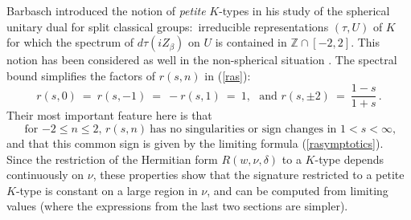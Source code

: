 \documentclass[12pt]{article}
\numberwithin{equation}{section}
\newcommand{\Z}{{\mathbb{Z}}}
\renewcommand\({\left(}
\renewcommand\){\right)}
\begin{document}
Barbasch \cite{petite} introduced the notion of {\it petite} $K$-types in his study of the spherical unitary dual for split classical groups:~irreducible representations $(\tau,U)$  of $K$ for which the spectrum of $d\tau(iZ_\beta)$ on $U$ is contained in $\Z\cap[-2,2]$.  This notion has been considered as well in the non-spherical situation \cite{jeringu,annegret}.
  The spectral bound simplifies the factors of $r(s,n)$ in (\ref{ras}):
\begin{equation}\label{smallras}
 r(s,0) \ = \ r(s,-1) \ = \ -r(s,1) \ = \ 1,  \text{~~and~}r(s,\pm 2) \ = \ \frac{1-s}{1+s}\,.
\end{equation}
 Their most important feature here is that
\begin{equation}\label{rasdoesntchangesign}
  \text{ for $-2\le n \le 2$,~} r(s,n) \ \text{has no singularities or sign changes in }1<s<\infty,
\end{equation}
and that this common sign is given by the limiting formula (\ref{rasymptotics}).
Since the restriction of the Hermitian form $R(w,\nu,\delta)$ to a $K$-type depends continuously on $\nu$, these properties show that the signature restricted to a petite $K$-type is constant on a   large region in $\nu$, and can be computed from limiting values (where the expressions from the last two sections are simpler).
\end{document}
